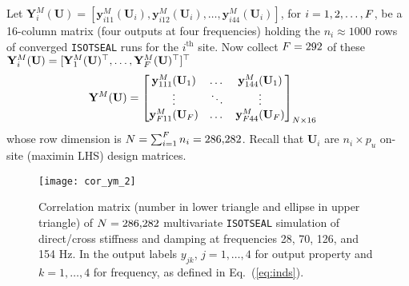 \documentclass[12pt]{article}
\newcommand{\blunew}[1]{\textcolor{black}{#1}} %
\begin{document}
Let $\mathbf{Y}_i^M(\mathbf{U}) = [\mathbf{y}_{i11}^M(\mathbf{U}_i),
\mathbf{y}_{i12}^M(\mathbf{U}_i), \dots, \mathbf{y}_{i44}^M(\mathbf{U}_i)]$,
for $i=1, 2, \dots,\blunew{F}$, be a 16-column matrix (four outputs at four
frequencies) holding the $n_i \approx 1000$ rows of converged {\tt ISOTSEAL} runs
for the $i^\mathrm{th}$ site.  Now collect $\blunew{F}=292$ 
of these $\mathbf{Y}_i^M(\mathbf{U}) = [\mathbf{Y}_1^M(\mathbf{U})^\top, \dots, 
\mathbf{Y}_{\blunew{F}}^M(\mathbf{U})^\top ]^\top$ 
\begin{align}
\mathbf{Y}^M(\mathbf{U}) &= \label{eq:ym}
\begin{bmatrix} \mathbf{y}^M_{111}(\mathbf{U}_1) %
& \dots & \mathbf{y}^M_{144}(\mathbf{U}_1)  \\
 \vdots %
 & \ddots & \vdots \\
\mathbf{y}^M_{\blunew{F}11}(\mathbf{U}_{\blunew{F}}) %
& \dots & \mathbf{y}^M_{\blunew{F}44}(\mathbf{U}_{\blunew{F}}) \end{bmatrix}_{\blunew{N} \times 16} 
\end{align}
whose row dimension is  $\blunew{N} = \sum_{i=1}^{\blunew{F}} n_i = 286{,}282$.
Recall that $\mathbf{U}_i$ are $n_i \times p_u$ on-site (maximin LHS) design
matrices.

\begin{figure}[ht!]
\centering
\texttt{[image: cor\_ym\_2]}
\caption{Correlation matrix (number in lower triangle and ellipse in upper triangle) 
of $\blunew{N} = 286{,}282$ multivariate {\tt ISOTSEAL} simulation of direct/cross
stiffness and damping at frequencies 28, 70, 126, and 154 Hz. In the output
labels $y_{jk}$,  $j = 1, \dots, 4$ for output property and $k = 1, \dots, 4$ for
frequency, as defined in Eq.~(\ref{eq:inds}).}
\label{fig:cor_ym}
\end{figure}
\end{document}
